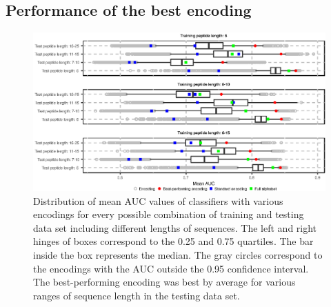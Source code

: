 \documentclass[a4,center,fleqn]{NAR}
\begin{document}
\subsection{Performance of the best encoding}
%
%
%
%
\begin{figure}[!tpb]
\centerline{\includegraphics{figures/AUC_boxplot.eps}}
\caption{Distribution of mean AUC values of classifiers with various encodings for every possible combination of training and testing data set including different lengths of sequences. 
The left and right hinges of boxes correspond to the 0.25 and 0.75 quartiles. 
The bar inside the box represents the median. The gray circles correspond to the
encodings with the AUC outside the 0.95 confidence interval. The best-performing encoding was best by average for various ranges of sequence length in the testing data set.
}\label{fig:AUC_boxplot} 
\end{figure}
%
%
\end{document}
